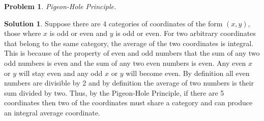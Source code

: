 \documentclass{article}
\newtheorem{problem}{Problem}
\theoremstyle{definition}
\newtheorem*{solution}{Solution}
\begin{document}
\begin{problem} 

Pigeon-Hole Principle.

\end{problem}

\begin{solution}

Suppose there are 4 categories of coordinates of the form \((x,y)\), those where \(x\) is odd or even and \(y\) is odd or even. For two arbitrary coordinates that belong to the same category, the average of the two coordinates is integral. This is because of the property of even and odd numbers that the sum of any two odd numbers is even and the sum of any two even numbers is even. Any even \(x\) or \(y\) will stay even and any odd \(x\) or \(y\) will become even. By definition all even numbers are divisible by 2 and by definition the average of two numbers is their sum divided by two. Thus, by the Pigeon-Hole Principle, if there are 5 coordinates then two of the coordinates must share a category and can produce an integral average coordinate.

\end{solution}
\end{document}
